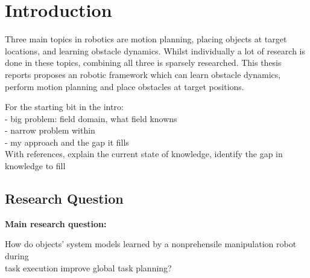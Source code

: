 \chapter{Introduction}
\label{chap: introduction}


Three main topics in robotics are motion planning, placing objects at target locations, and learning obstacle dynamics. Whilst individually a lot of research is done in these topics, combining all three is sparsely researched. This thesis reports proposes an robotic framework which can learn obstacle dynamics, perform motion planning and place obstacles at target positions. 









For the starting bit in the intro:\\
- big problem: field domain, what field knowns\\
- narrow problem within\\
- my approach and the gap it fills\\


With references, explain the current state of knowledge, identify the gap in knowledge to fill 

\section{Research Question}

\textbf{Main research question:}
\begin{center}
\label{researchquestion: main}
\large
How do objects' system models learned by a nonprehensile manipulation robot during\\  task execution improve global task planning?
\end{center} 

